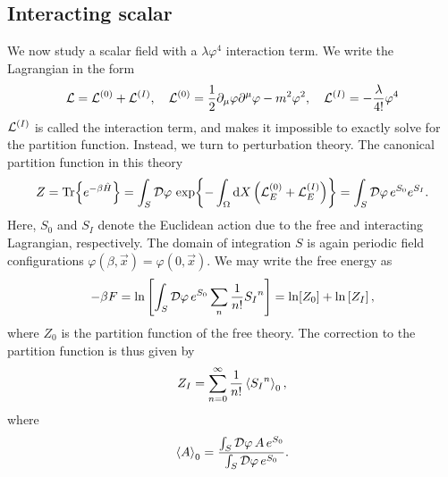 \subsection{Interacting scalar}

We now study a scalar field with a $\lambda \varphi^4$ interaction term.
We write the Lagrangian in the form
\begin{equation*}
    \mathcal{L} = \mathcal{L}^{(0)} + \mathcal{L}^{(I)}, \quad 
    \mathcal{L}^{(0)} = 
    \frac{1}{2} \partial_\mu \varphi \partial^\mu \varphi - m^2 \varphi^2 , \quad
    \mathcal{L}^{(I)} = - \frac{\lambda}{4!} \varphi^4
\end{equation*}
$\mathcal{L}^{(I)}$ is called the interaction term, and makes it impossible to exactly solve for the partition function.
Instead, we turn to perturbation theory.
The canonical partition function in this theory
\begin{equation}
    Z = \Tr{e^{- \beta \hat H}}
    = \int_S \mathcal{D} \varphi \, \exp{
        - \int_\Omega \dd X \left(\mathcal{L}_E^{(0)} + \mathcal{L}_E^{(I)}\right)
    }
    = \int_S \mathcal{D} \varphi \, e^{S_0} e^{S_I}.
\end{equation}
Here, $S_0$ and $S_I$ denote the Euclidean action due to the free and interacting Lagrangian, respectively.
The domain of integration $S$ is again periodic field configurations $\varphi(\beta, \vec x) = \varphi(0, \vec x)$.
We may write the free energy as
\begin{equation*}
    - \beta F = \ln
    \left[
        \int_S \mathcal{D} \varphi \, e^{S_0} \sum_n \frac{1}{n!} {S_I}^n
    \right]
    = \ln[Z_0] 
    + \ln
    \left[
        Z_I
    \right],
\end{equation*}
where $Z_0$ is the partition function of the free theory.
The correction to the partition function is thus given by
\begin{equation}
    Z_I = \sum_{n=0}^\infty \frac{1}{n!} \ex{{S_I}^n}_0,
\end{equation}
where
\begin{equation}
    \ex{A}_0 = \frac{
        \int_S \D \varphi \, A \, e^{S_0} }
    {\int_S \D \varphi \, e^{S_0}}.
\end{equation}

